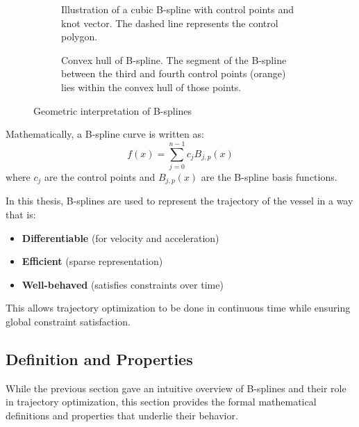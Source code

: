 \begin{figure}
    \centering
    \begin{subfigure}[b]{0.45\textwidth}
        \centering
        
        \caption{Illustration of a cubic B-spline with control points and knot vector. The dashed line represents the control polygon.}
        \label{fig:b-spline-knots-control-points}
    \end{subfigure}
    \hfill
    \begin{subfigure}[b]{0.45\textwidth}
        \centering
        
        \caption{Convex hull of B-spline. The segment of the B-spline between the third and fourth control points (orange) lies within the convex hull of those points.}
        \label{fig:b-spline-convex-hull} 
    \end{subfigure}
    \caption{Geometric interpretation of B-splines}
    \label{fig:b-spline-geometric}
\end{figure}

Mathematically, a B-spline curve is written as:
\[
f(x) = \sum_{j=0}^{n-1} c_j B_{j,p}(x)
\]
where \( c_j \) are the control points and \( B_{j,p}(x) \) are the B-spline basis functions.

In this thesis, B-splines are used to represent the trajectory of the vessel in a way that is:
\begin{itemize}
    \item \textbf{Differentiable} (for velocity and acceleration)
    \item \textbf{Efficient} (sparse representation)
    \item \textbf{Well-behaved} (satisfies constraints over time)
\end{itemize}

This allows trajectory optimization to be done in continuous time while ensuring global constraint satisfaction. 





\subsection{Definition and Properties}\label{sec:b-spline-definition}
While the previous section gave an intuitive overview of B-splines and their role in trajectory optimization, this section provides the formal mathematical definitions and properties that underlie their behavior.


